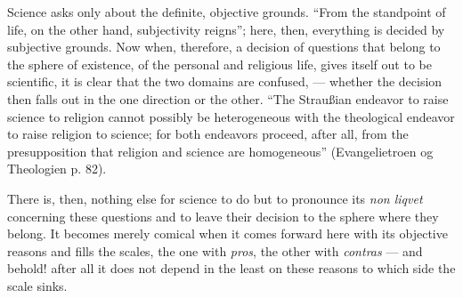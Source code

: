 \documentclass[12pt,a4paper]{book}
\newcommand{\opage}[1]{\marginnote{\footnotesize\textit{[#1]}}}
\begin{document}
Science asks only about the definite, objective grounds.
``From the standpoint of life, on the other hand, subjectivity reigns''; here,
then, everything is decided by subjective grounds. Now when, therefore, a
decision of questions that belong to the sphere of existence, of the personal
and religious life, gives itself out to be
scientific, it is clear that the two domains are confused,
--- whether the decision then falls out in the one direction or the other.
``The Straußian endeavor to raise science to
religion cannot possibly be heterogeneous with the theological
endeavor to raise religion to science; for both
\opage{39}\setcounter{footnote}{0}%
endeavors proceed, after all, from the presupposition that religion and
science are homogeneous'' (Evangelietroen og Theologien p. 82).

There is, then, nothing else for science to do but to
pronounce its \textit{non liqvet} concerning these questions and to leave
their decision to the sphere where they belong. It
becomes merely comical when it comes forward here with its objective
reasons and fills the scales, the one with \textit{pros}, the
other with \textit{contras} --- and behold! after all it does not depend in the least
on these reasons to which side the scale sinks.
\end{document}
